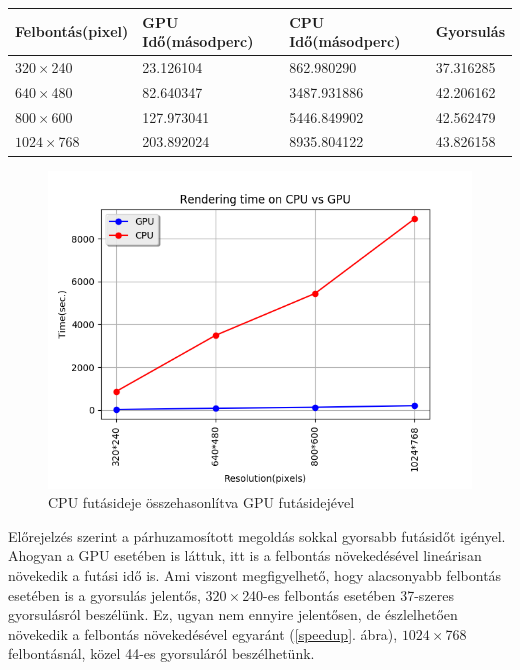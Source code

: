 \documentclass[12pt, a4paper, oneside]{book}
\theoremstyle{tetel}
\begin{document}
\begin{center}
	\begin{tabular}{ | l | l | l | l| }
		\hline
		Felbontás(pixel) & GPU Idő(másodperc) &  CPU Idő(másodperc) & Gyorsulás\\ \hline
		$320 \times $240 & 23.126104 & 862.980290 & 37.316285\\ \hline
		$640 \times $480 & 82.640347 & 3487.931886 & 42.206162\\ \hline
		$800 \times $600 & 127.973041 & 5446.849902 & 42.562479\\ \hline
		$1024 \times $768 & 203.892024 & 8935.804122 & 43.826158\\ \hline
	\end{tabular}
\end{center}

\begin{figure}[!htbp]
	\begin{center}
		\includegraphics[scale=0.8]{cpu_vs_gpu.png}
		\caption{CPU futásideje összehasonlítva GPU futásidejével}
		\label{cpu_vs_gpu}
	\end{center}
\end{figure}

Előrejelzés szerint a párhuzamosított megoldás sokkal gyorsabb futásidőt igényel. Ahogyan a GPU esetében is láttuk, itt is a felbontás növekedésével lineárisan növekedik a futási idő is. Ami viszont megfigyelhető, hogy alacsonyabb felbontás esetében is a gyorsulás jelentős, $320 \times $240-es felbontás esetében 37-szeres gyorsulásról beszélünk. Ez, ugyan nem ennyire jelentősen, de észlelhetően növekedik a felbontás növekedésével egyaránt (\ref{speedup}. ábra), $1024 \times $768 felbontásnál, közel 44-es gyorsuláról beszélhetünk.
\end{document}
